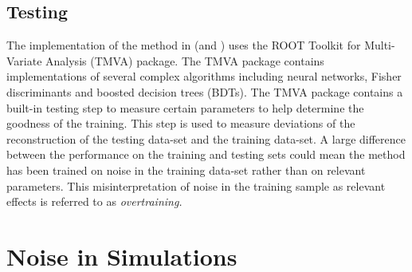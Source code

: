 \documentclass[main.tex]{subfiles}
\begin{document}
\subsection{Testing}
The implementation of the \disp method in \vegas (and \ed) uses the ROOT Toolkit for Multi-Variate Analysis (TMVA) package. The TMVA package contains implementations of several complex algorithms including neural networks, Fisher discriminants and boosted decision trees (BDTs). The TMVA package contains a built-in testing step to measure certain parameters to help determine the goodness of the training. This step is used to measure deviations of the reconstruction of the testing data-set and the training data-set. A large difference between the performance on the training and testing sets could mean the method has been trained on noise in the training data-set rather than on relevant parameters. This misinterpretation of noise in the training sample as relevant effects is referred to as \it{overtraining}.

\section{Noise in Simulations}
\end{document}
